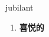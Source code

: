 
\begin{frame}
{\huge jubilant}
\begin{center}
\begin{enumerate}\Large
  \item \textbf{喜悦的}
\end{enumerate}
\end{center}
\end{frame}

